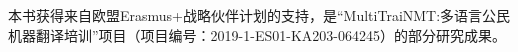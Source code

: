 \addchap{\lsAcknowledgementTitle}

\begin{sloppypar}
本书获得来自欧盟Erasmus+战略伙伴计划的支持，是“\mbox{MultiTraiNMT}:多语言公民机器翻译培训”项目（项目编号：2019-1-ES01-KA203-064245）的部分研究成果。
\end{sloppypar}
